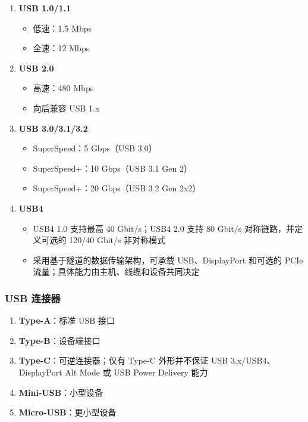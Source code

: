 \begin{enumerate}
  \item \textbf{USB 1.0/1.1}
    \begin{itemize}
      \item 低速：1.5 Mbps
      \item 全速：12 Mbps
    \end{itemize}

  \item \textbf{USB 2.0}
    \begin{itemize}
      \item 高速：480 Mbps
      \item 向后兼容 USB 1.x
    \end{itemize}

  \item \textbf{USB 3.0/3.1/3.2}
    \begin{itemize}
      \item SuperSpeed：5 Gbps（USB 3.0）
      \item SuperSpeed+：10 Gbps（USB 3.1 Gen 2）
      \item SuperSpeed+：20 Gbps（USB 3.2 Gen 2x2）
    \end{itemize}

  \item \textbf{USB4}
    \begin{itemize}
      \item USB4 1.0 支持最高 40 Gbit/s；USB4 2.0 支持 80 Gbit/s 对称链路，并定义可选的 120/40 Gbit/s 非对称模式
      \item 采用基于隧道的数据传输架构，可承载 USB、DisplayPort 和可选的 PCIe 流量；具体能力由主机、线缆和设备共同决定
    \end{itemize}
\end{enumerate}

\subsubsection{USB 连接器}

\begin{enumerate}
  \item \textbf{Type-A}：标准 USB 接口
  \item \textbf{Type-B}：设备端接口
  \item \textbf{Type-C}：可逆连接器；仅有 Type-C 外形并不保证 USB 3.x/USB4、DisplayPort Alt Mode 或 USB Power Delivery 能力
  \item \textbf{Mini-USB}：小型设备
  \item \textbf{Micro-USB}：更小型设备
\end{enumerate}

